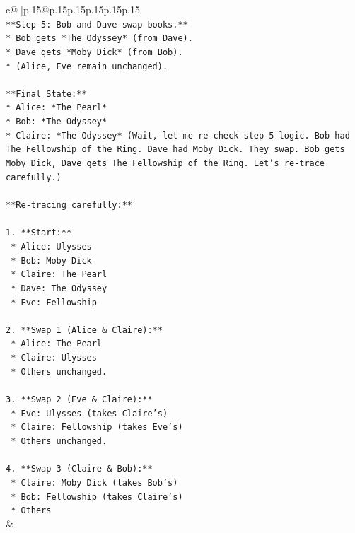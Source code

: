 \documentclass{article}
\begin{document}
{\begin{supertabular}{c@{$\;$}|p{.15\linewidth}@{}p{.15\linewidth}p{.15\linewidth}p{.15\linewidth}p{.15\linewidth}p{.15\linewidth}}
{{{\\ 
\texttt{**Step 5: Bob and Dave swap books.**} \\
\texttt{*   Bob gets *The Odyssey* (from Dave).} \\
\texttt{*   Dave gets *Moby Dick* (from Bob).} \\
\texttt{*   (Alice, Eve remain unchanged).} \\
\\ 
\texttt{**Final State:**} \\
\texttt{*   Alice: *The Pearl*} \\
\texttt{*   Bob: *The Odyssey*} \\
\texttt{*   Claire: *The Odyssey* (Wait, let me re{-}check step 5 logic. Bob had The Fellowship of the Ring. Dave had Moby Dick. They swap. Bob gets Moby Dick, Dave gets The Fellowship of the Ring. Let's re{-}trace carefully.)} \\
\\ 
\texttt{**Re{-}tracing carefully:**} \\
\\ 
\texttt{1.  **Start:**} \\
\texttt{    *   Alice: Ulysses} \\
\texttt{    *   Bob: Moby Dick} \\
\texttt{    *   Claire: The Pearl} \\
\texttt{    *   Dave: The Odyssey} \\
\texttt{    *   Eve: Fellowship} \\
\\ 
\texttt{2.  **Swap 1 (Alice \& Claire):**} \\
\texttt{    *   Alice: The Pearl} \\
\texttt{    *   Claire: Ulysses} \\
\texttt{    *   Others unchanged.} \\
\\ 
\texttt{3.  **Swap 2 (Eve \& Claire):**} \\
\texttt{    *   Eve: Ulysses (takes Claire's)} \\
\texttt{    *   Claire: Fellowship (takes Eve's)} \\
\texttt{    *   Others unchanged.} \\
\\ 
\texttt{4.  **Swap 3 (Claire \& Bob):**} \\
\texttt{    *   Claire: Moby Dick (takes Bob's)} \\
\texttt{    *   Bob: Fellowship (takes Claire's)} \\
\texttt{    *   Others} \\
            }
        }
    }
    & \\ \\


\end{supertabular}}
\end{document}
